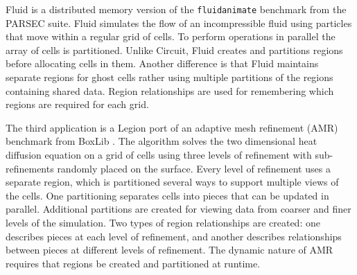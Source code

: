 Fluid is a distributed memory version of the {\tt fluidanimate} benchmark from the PARSEC 
suite\cite{bienia11benchmarking}.  Fluid simulates the flow of an incompressible fluid
using particles that move within a regular grid of cells.  To perform operations in 
parallel the array of cells is partitioned.  Unlike
Circuit, Fluid creates and partitions regions before
allocating cells in them. 
Another difference is that Fluid
maintains separate regions for ghost cells rather using multiple partitions of
the regions containing shared data.  Region relationships are used for remembering
which regions are required for each grid.


The third application is a Legion port of an adaptive mesh refinement (AMR) benchmark 
from BoxLib \cite{BoxLib}.  The algorithm solves the two
dimensional heat diffusion equation on a grid of cells using three levels of refinement with sub-refinements
randomly placed on the surface.  
Every level of refinement uses a separate region, which is partitioned several ways to support multiple views of
the cells.  One partitioning separates cells into pieces that can be updated in
parallel.  Additional partitions are created for viewing data from coarser and finer levels of
the simulation.  Two types of region relationships are created: one describes pieces at 
each level of refinement, and another describes relationships between pieces at different
levels of refinement.  
The dynamic nature of AMR requires that regions be created and partitioned at runtime.  


